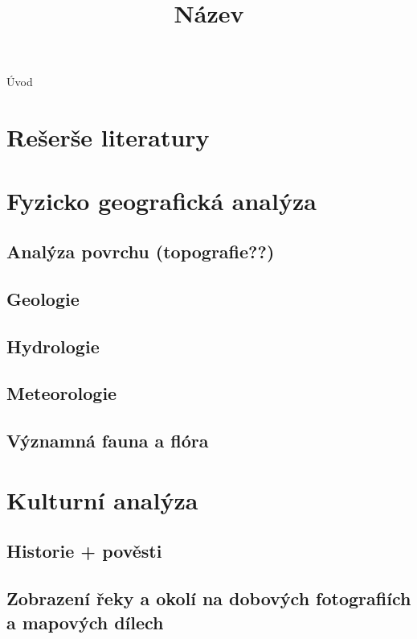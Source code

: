 \documentclass[thesis=M,czech]{FITthesis}[2012/06/26]
\title{Název}
\begin{document}

\begin{introduction}
Úvod


\end{introduction}

\chapter{Rešerše literatury}


\chapter{Fyzicko geografická analýza}


\section{Analýza povrchu (topografie??)}

\section{Geologie}

\section{Hydrologie}	


\section{Meteorologie}

\section{Významná fauna a flóra}


\chapter{Kulturní analýza}


\section{Historie + pověsti}

\section{Zobrazení řeky a okolí na dobových fotografiích a mapových dílech}
\end{document}
